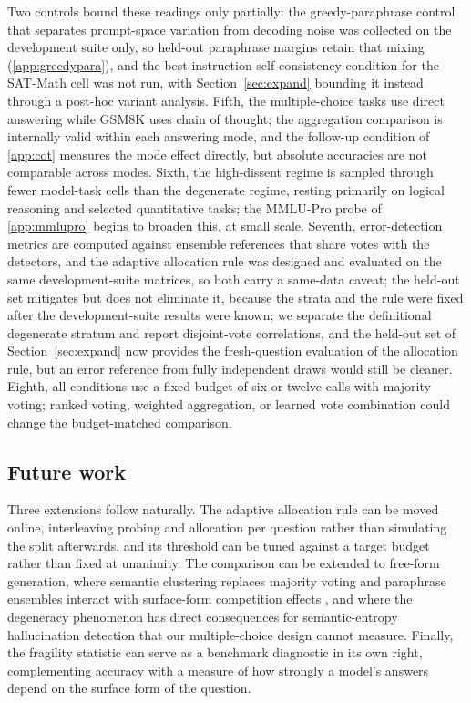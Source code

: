 Two controls bound these readings only partially: the greedy-paraphrase control that separates prompt-space variation from decoding noise was collected on the development suite only, so held-out paraphrase margins retain that mixing (\ref{app:greedypara}), and the best-instruction self-consistency condition for the SAT-Math cell was not run, with Section~\ref{sec:expand} bounding it instead through a post-hoc variant analysis. Fifth, the multiple-choice tasks use direct answering while GSM8K uses chain of thought; the aggregation comparison is internally valid within each answering mode, and the follow-up condition of \ref{app:cot} measures the mode effect directly, but absolute accuracies are not comparable across modes. Sixth, the high-dissent regime is sampled through fewer model-task cells than the degenerate regime, resting primarily on logical reasoning and selected quantitative tasks; the MMLU-Pro probe of \ref{app:mmlupro} begins to broaden this, at small scale. Seventh, error-detection metrics are computed against ensemble references that share votes with the detectors, and the adaptive allocation rule was designed and evaluated on the same development-suite matrices, so both carry a same-data caveat; the held-out set mitigates but does not eliminate it, because the strata and the rule were fixed after the development-suite results were known; we separate the definitional degenerate stratum and report disjoint-vote correlations, and the held-out set of Section~\ref{sec:expand} now provides the fresh-question evaluation of the allocation rule, but an error reference from fully independent draws would still be cleaner. Eighth, all conditions use a fixed budget of six or twelve calls with majority voting; ranked voting, weighted aggregation, or learned vote combination could change the budget-matched comparison.

\subsection{Future work}

Three extensions follow naturally. The adaptive allocation rule can be moved online, interleaving probing and allocation per question rather than simulating the split afterwards, and its threshold can be tuned against a target budget rather than fixed at unanimity. The comparison can be extended to free-form generation, where semantic clustering replaces majority voting and paraphrase ensembles interact with surface-form competition effects \citep{holtzman2021surface}, and where the degeneracy phenomenon has direct consequences for semantic-entropy hallucination detection that our multiple-choice design cannot measure. Finally, the fragility statistic can serve as a benchmark diagnostic in its own right, complementing accuracy with a measure of how strongly a model's answers depend on the surface form of the question.
